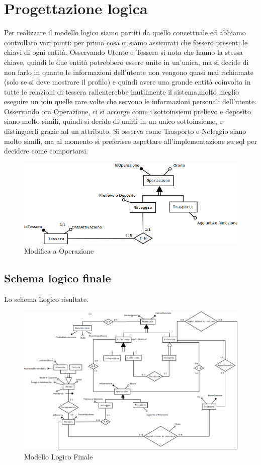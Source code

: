 \documentclass[a4paper,twoside]{article}
\begin{document}
\section{Progettazione logica}
Per realizzare il modello logico siamo partiti da quello concettuale ed abbiamo controllato vari punti:
per prima cosa ci siamo assicurati che fossero presenti le chiavi di ogni entità.\newline
Osservando Utente e Tessera si nota che hanno la stessa chiave, quindi le due entità potrebbero essere unite in un'unica, ma si decide di non farlo in quanto le informazioni dell'utente non vengono quasi mai richiamate (solo se si deve mostrare il profilo) e quindi avere una grande entità coinvolta in tutte le relazioni di tessera rallenterebbe inutilmente il sistema,molto meglio eseguire un join quelle rare volte che servono le informazioni personali dell'utente.\newline
Osservando ora Operazione, ci si accorge come i sottoinsiemi prelievo e deposito siano molto simili, quindi si decide di unirli in un unico sottoinsieme, e distinguerli grazie ad un attributo.\newline
Si osserva come Trasporto e Noleggio siano molto simili, ma al momento si preferisce aspettare all'implementazione su sql per decidere come comportarsi.
\begin{figure}[H]
 \centering
  \includegraphics[width=1\textwidth]{Logico01}
\caption{Modifica a Operazione}
\end{figure}
\newpage
\subsection{Schema logico finale}
Lo schema Logico risultate.
\begin{figure}[H]
 \centering
  \includegraphics[width=1.35\textwidth,angle=90]{LogicoFinale}
\caption{Modello Logico Finale}
\end{figure}
\newpage
\end{document}
